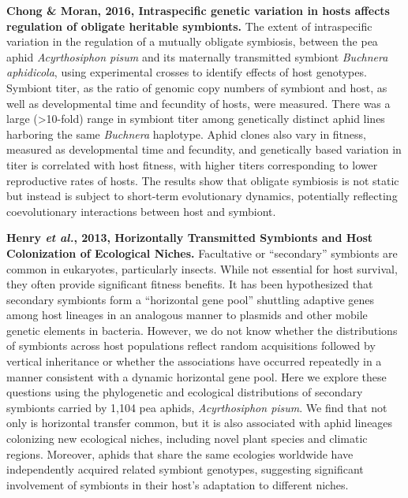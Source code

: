 \documentclass[11pt]{article}
\begin{document}
\begin{sloppypar}
\par
\textbf{Chong & Moran, 2016, Intraspecific genetic variation in hosts affects regulation of obligate heritable symbionts.} \newline
The extent of intraspecific variation in the regulation of a mutually obligate symbiosis, between the pea aphid \textit{Acyrthosiphon pisum} and its maternally transmitted symbiont \textit{Buchnera aphidicola}, using experimental crosses to identify effects of host genotypes. 
Symbiont titer, as the ratio of genomic copy numbers of symbiont and host, as well as developmental time and fecundity of hosts, were measured. 
There was a large (>10-fold) range in symbiont titer among genetically distinct aphid lines harboring the same \textit{Buchnera} haplotype. 
Aphid clones also vary in fitness, measured as developmental time and fecundity, and genetically based variation in titer is correlated with host fitness, with higher titers corresponding to lower reproductive rates of hosts. 
The results show that obligate symbiosis is not static but instead is subject to short-term evolutionary dynamics, potentially reflecting coevolutionary interactions between host and symbiont.
\par
\textbf{Henry \textit{et al.}, 2013, Horizontally Transmitted Symbionts and Host Colonization of Ecological Niches.} \newline
Facultative or “secondary” symbionts are common in eukaryotes, particularly insects. 
While not essential for host survival, they often provide significant fitness benefits. 
It has been hypothesized that secondary symbionts form a “horizontal gene pool” shuttling adaptive genes among host lineages in an analogous manner to plasmids and other mobile genetic elements in bacteria. 
However, we do not know whether the distributions of symbionts across host populations reflect 
random acquisitions followed by vertical inheritance or whether 
the associations have occurred repeatedly in a manner consistent with a dynamic horizontal gene pool. 
Here we explore these questions using the phylogenetic and ecological distributions of secondary symbionts carried by 1,104 pea aphids, \textit{Acyrthosiphon pisum}. 
We find that not only is horizontal transfer common, but it is also associated with aphid lineages colonizing new ecological niches, including novel plant species and climatic regions. 
Moreover, aphids that share the same ecologies worldwide have independently acquired related symbiont genotypes, suggesting significant involvement of symbionts in their host’s adaptation to different niches. 

\end{sloppypar}
\end{document}

